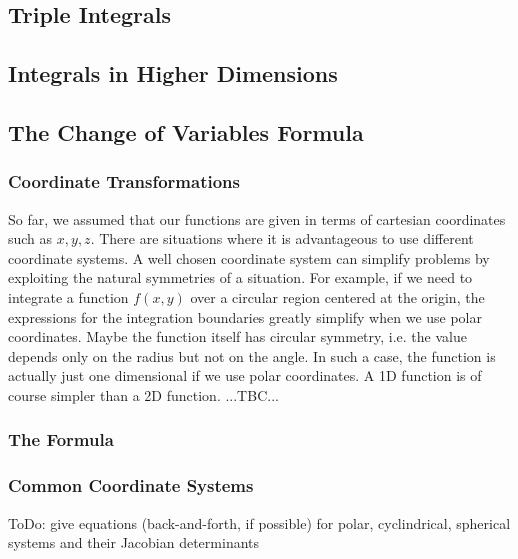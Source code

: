 \subsection{Triple Integrals}


\subsection{Integrals in Higher Dimensions}


\subsection{The Change of Variables Formula}

\subsubsection{Coordinate Transformations}
So far, we assumed that our functions are given in terms of cartesian coordinates such as $x,y,z$. There are situations where it is advantageous to use different coordinate systems. A well chosen coordinate system can simplify problems by exploiting the natural symmetries of a situation. For example, if we need to integrate a function $f(x,y)$ over a circular region centered at the origin, the expressions for the integration boundaries greatly simplify when we use polar coordinates. Maybe the function itself has circular symmetry, i.e. the value depends only on the radius but not on the angle. In such a case, the function is actually just one dimensional if we use polar coordinates. A 1D function is of course simpler than a 2D function. 
...TBC...

\subsubsection{The Formula}

\subsubsection{Common Coordinate Systems}
ToDo: give equations (back-and-forth, if possible) for polar, cyclindrical, spherical systems and their Jacobian determinants

